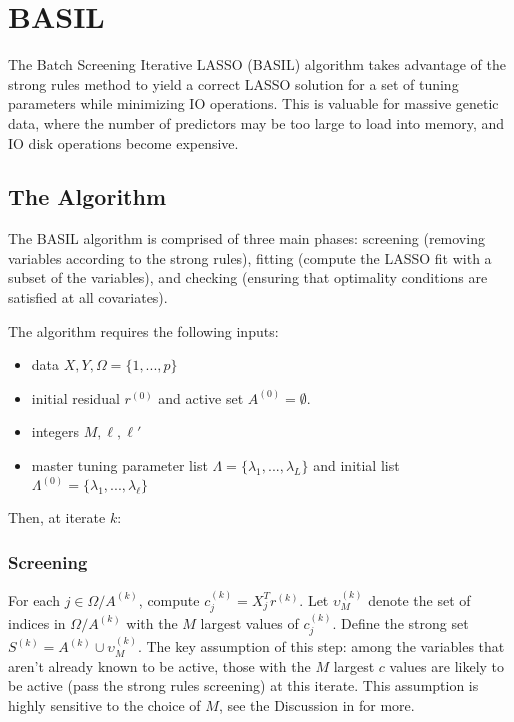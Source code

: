 \documentclass{amsart}
\begin{document}
\section{BASIL}

The Batch Screening Iterative LASSO (BASIL) \cite{qian_fast_2020} algorithm takes advantage of the
strong rules method to yield a correct LASSO solution for a set of tuning
parameters while minimizing IO operations. This is valuable for massive genetic
data, where the number of predictors may be too large to load into memory, and
IO disk operations become expensive. 

\subsection{The Algorithm} The BASIL algorithm is comprised of three main
phases: screening (removing variables according to the strong rules), fitting
(compute the LASSO fit with a subset of the variables), and checking (ensuring
that optimality conditions are satisfied at all covariates).

\bigskip

The algorithm requires the following inputs:

\begin{itemize}
	\item data $X, Y, \Omega = \{1, ..., p \}$
	\item initial residual $r^{(0)}$ and active set $A^{(0)} = \emptyset$. 
	\item integers $M, \ell, \ell'$
	\item master tuning parameter list $\Lambda = \{\lambda_1, ...,
	\lambda_L \}$ and initial list $\Lambda^{(0)} = \{ \lambda_1, ...,
	\lambda_{\ell} \}$
\end{itemize}

Then, at iterate $k$:

\subsubsection{Screening} For each $j \in \Omega / A^{(k)}$, compute $c_j^{(k)} =
X_j^Tr^{(k)}$. Let $\upsilon_M^{(k)}$ denote the set of indices in $\Omega / A^{(k)}$
with the $M$ largest values of $c_j^{(k)}$. Define the strong set $S^{(k)} =
A^{(k)} \cup \upsilon_M^{(k)}$. The key assumption of this step: among the
variables that aren't already known to be active, those with the $M$ largest $c$
values are likely to be active (pass the strong rules screening) at this
iterate. This assumption is highly sensitive to the choice of $M$, see the
Discussion in \cite{qian_fast_2020} for more.
\end{document}
